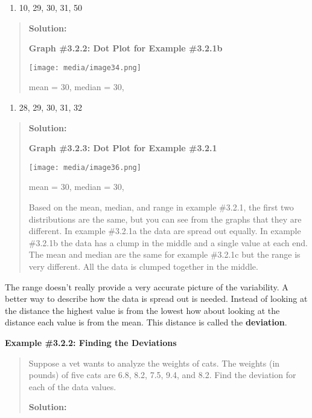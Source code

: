 \documentclass[]{book}
\providecommand{\tightlist}{%
  \setlength{\itemsep}{0pt}\setlength{\parskip}{0pt}}
\begin{document}
\begin{enumerate}
\def\labelenumi{\alph{enumi})}
\setcounter{enumi}{1}
\tightlist
\item
  10, 29, 30, 31, 50
\end{enumerate}

\begin{quote}
\textbf{Solution:}

\textbf{Graph \#3.2.2: Dot Plot for Example \#3.2.1b}

\texttt{[image: media/image34.png]}

mean = 30, median = 30,
\end{quote}

\begin{enumerate}
\def\labelenumi{\alph{enumi})}
\setcounter{enumi}{2}
\tightlist
\item
  28, 29, 30, 31, 32
\end{enumerate}

\begin{quote}
\textbf{Solution:}

\textbf{Graph \#3.2.3: Dot Plot for Example \#3.2.1}

\texttt{[image: media/image36.png]}

mean = 30, median = 30,

Based on the mean, median, and range in example \#3.2.1, the first two
distributions are the same, but you can see from the graphs that they
are different. In example \#3.2.1a the data are spread out equally. In
example \#3.2.1b the data has a clump in the middle and a single value
at each end. The mean and median are the same for example \#3.2.1c but
the range is very different. All the data is clumped together in the
middle.
\end{quote}

The range doesn't really provide a very accurate picture of the
variability. A better way to describe how the data is spread out is
needed. Instead of looking at the distance the highest value is from the
lowest how about looking at the distance each value is from the mean.
This distance is called the \textbf{deviation}.

\textbf{Example \#3.2.2: Finding the Deviations}

\begin{quote}
Suppose a vet wants to analyze the weights of cats. The weights (in
pounds) of five cats are 6.8, 8.2, 7.5, 9.4, and 8.2. Find the
deviation for each of the data values.

\textbf{Solution:}
\end{quote}
\end{document}
